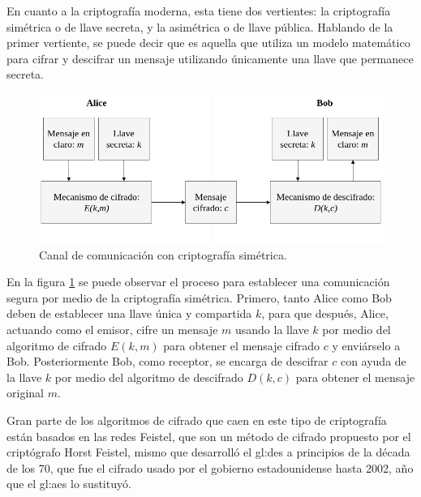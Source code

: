   En cuanto a la criptografía moderna, esta tiene dos vertientes: la
  criptografía simétrica o de llave secreta, y la asimétrica o de llave
  pública. Hablando de la primer vertiente, se puede decir que es aquella
  que utiliza un modelo matemático para cifrar y descifrar un mensaje
  utilizando únicamente una llave que permanece secreta.

  \begin{figure}[H]
    \begin{center}
      \includegraphics[width=0.8\linewidth]
        {contenidos/antecedentes/intro/img/cripto_simetrica.png}
      \caption{Canal de comunicación con criptografía simétrica.}
      \label{cripto_simetrica}
    \end{center}
  \end{figure}

  En la figura \ref{cripto_simetrica} se puede observar el proceso para 
  establecer una comunicación segura por medio de la criptografía simétrica. 
  Primero, tanto Alice como Bob deben de establecer una llave única y 
  compartida $k$, para que después, Alice, actuando como el emisor, cifre un 
  mensaje $m$ usando la llave $k$ por medio del algoritmo de cifrado $E(k,m)$ 
  para obtener el mensaje cifrado $c$ y enviárselo a Bob. Posteriormente Bob, 
  como receptor, se encarga de descifrar $c$ con ayuda de la llave $k$ por 
  medio del algoritmo de descifrado $D(k,c)$ para obtener el mensaje original 
  $m$.


  Gran parte de los algoritmos de cifrado que caen en este tipo de criptografía 
  están basados en las redes Feistel, que son un método de cifrado propuesto 
  por el criptógrafo Horst Feistel, mismo que desarrolló el \acrfull{gl:des} a 
  principios de la década de los 70, que fue el cifrado usado por el gobierno 
  estadounidense hasta 2002, año que el \acrfull{gl:aes} lo sustituyó. 

